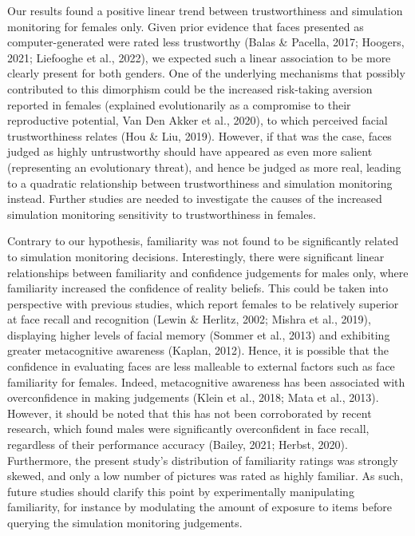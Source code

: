 \documentclass[
  man,floatsintext]{apa6}
\begin{document}
Our results found a positive linear trend between trustworthiness and simulation monitoring for females only. Given prior evidence that faces presented as computer-generated were rated less trustworthy (Balas \& Pacella, 2017; Hoogers, 2021; Liefooghe et al., 2022), we expected such a linear association to be more clearly present for both genders. One of the underlying mechanisms that possibly contributed to this dimorphism could be the increased risk-taking aversion reported in females (explained evolutionarily as a compromise to their reproductive potential, Van Den Akker et al., 2020), to which perceived facial trustworthiness relates (Hou \& Liu, 2019). However, if that was the case, faces judged as highly untrustworthy should have appeared as even more salient (representing an evolutionary threat), and hence be judged as more real, leading to a quadratic relationship between trustworthiness and simulation monitoring instead. Further studies are needed to investigate the causes of the increased simulation monitoring sensitivity to trustworthiness in females.

Contrary to our hypothesis, familiarity was not found to be significantly related to simulation monitoring decisions. Interestingly, there were significant linear relationships between familiarity and confidence judgements for males only, where familiarity increased the confidence of reality beliefs. This could be taken into perspective with previous studies, which report females to be relatively superior at face recall and recognition (Lewin \& Herlitz, 2002; Mishra et al., 2019), displaying higher levels of facial memory (Sommer et al., 2013) and exhibiting greater metacognitive awareness (Kaplan, 2012). Hence, it is possible that the confidence in evaluating faces are less malleable to external factors such as face familiarity for females. Indeed, metacognitive awareness has been associated with overconfidence in making judgements (Klein et al., 2018; Mata et al., 2013). However, it should be noted that this has not been corroborated by recent research, which found males were significantly overconfident in face recall, regardless of their performance accuracy (Bailey, 2021; Herbst, 2020). Furthermore, the present study's distribution of familiarity ratings was strongly skewed, and only a low number of pictures was rated as highly familiar. As such, future studies should clarify this point by experimentally manipulating familiarity, for instance by modulating the amount of exposure to items before querying the simulation monitoring judgements.
\end{document}
